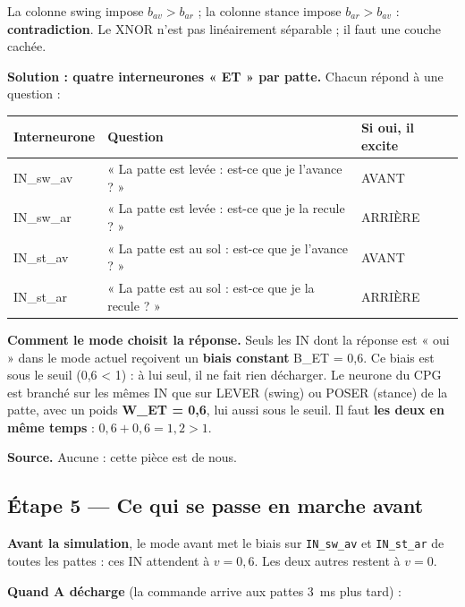 \documentclass[11pt]{article}
\newcommand{\champ}[2]{\par\noindent\textbf{\color{bleu}#1} #2\par}
\newcommand{\code}[1]{\texttt{#1}}
\begin{document}
La colonne swing impose $b_{av} > b_{ar}$ ; la colonne stance impose $b_{ar} > b_{av}$ :
\textbf{contradiction}. Le XNOR n'est pas linéairement séparable ; il faut une couche cachée.

\champ{Solution : quatre interneurones « ET » par patte.}{Chacun répond à une question :}

\begin{center}
\begin{tabularx}{0.92\linewidth}{>{\ttfamily}l X l}
  \toprule
  \textrm{\textbf{Interneurone}} & \textbf{Question} & \textbf{Si oui, il excite}\\ \midrule
  IN\_sw\_av & « La patte est levée : est-ce que je l'avance ? »   & AVANT\\
  IN\_sw\_ar & « La patte est levée : est-ce que je la recule ? »  & ARRIÈRE\\
  IN\_st\_av & « La patte est au sol : est-ce que je l'avance ? »  & AVANT\\
  IN\_st\_ar & « La patte est au sol : est-ce que je la recule ? » & ARRIÈRE\\ \bottomrule
\end{tabularx}
\end{center}

\champ{Comment le mode choisit la réponse.}{Seuls les IN dont la réponse est « oui » dans le mode
actuel reçoivent un \textbf{biais constant} B\_ET = 0,6. Ce biais est sous le seuil (0,6 < 1) :
à lui seul, il ne fait rien décharger. Le neurone du CPG est branché sur les mêmes IN que sur
LEVER (swing) ou POSER (stance) de la patte, avec un poids \textbf{W\_ET = 0,6}, lui aussi sous le
seuil. Il faut \textbf{les deux en même temps} : $0{,}6 + 0{,}6 = 1{,}2 > 1$.}

\champ{Source.}{Aucune : cette pièce est de nous.}

\subsection*{Étape 5 --- Ce qui se passe en marche avant}

\textbf{Avant la simulation}, le mode avant met le biais sur \code{IN\_sw\_av} et
\code{IN\_st\_ar} de toutes les pattes : ces IN attendent à $v = 0{,}6$. Les deux autres restent à
$v = 0$.

\textbf{Quand A décharge} (la commande arrive aux pattes 3~ms plus tard) :
\end{document}
